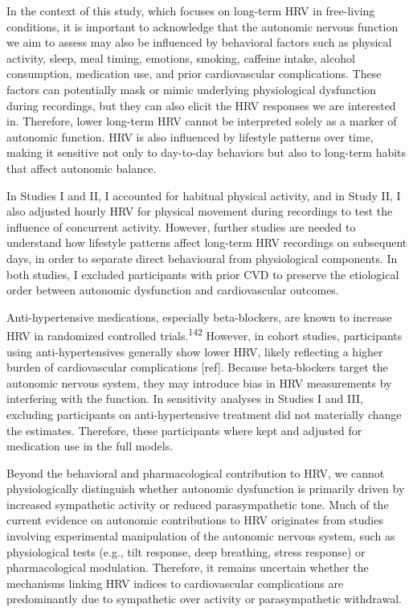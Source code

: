 \documentclass[
  letterpaper,
  headsepline=true,
  open=any]{scrbook}
\begin{document}
In the context of this study, which focuses on long-term HRV in
free-living conditions, it is important to acknowledge that the
autonomic nervous function we aim to assess may also be influenced by
behavioral factors such as physical activity, sleep, meal timing,
emotions, smoking, caffeine intake, alcohol consumption, medication use,
and prior cardiovascular complications. These factors can potentially
mask or mimic underlying physiological dysfunction during recordings,
but they can also elicit the HRV responses we are interested in.
Therefore, lower long-term HRV cannot be interpreted solely as a marker
of autonomic function. HRV is also influenced by lifestyle patterns over
time, making it sensitive not only to day-to-day behaviors but also to
long-term habits that affect autonomic balance.

In Studies I and II, I accounted for habitual physical activity, and in
Study II, I also adjusted hourly HRV for physical movement during
recordings to test the influence of concurrent activity. However,
further studies are needed to understand how lifestyle patterns affect
long-term HRV recordings on subsequent days, in order to separate direct
behavioural from physiological components. In both studies, I excluded
participants with prior CVD to preserve the etiological order between
autonomic dysfunction and cardiovascular outcomes.

Anti-hypertensive medications, especially beta-blockers, are known to
increase HRV in randomized controlled trials.\textsuperscript{142}
However, in cohort studies, participants using anti-hypertensives
generally show lower HRV, likely reflecting a higher burden of
cardiovascular complications {[}ref{]}. Because beta-blockers target the
autonomic nervous system, they may introduce bias in HRV measurements by
interfering with the function. In sensitivity analyses in Studies I and
III, excluding participants on anti-hypertensive treatment did not
materially change the estimates. Therefore, these participants where
kept and adjusted for medication use in the full models.

Beyond the behavioral and pharmacological contribution to HRV, we cannot
physiologically distinguish whether autonomic dysfunction is primarily
driven by increased sympathetic activity or reduced parasympathetic
tone. Much of the current evidence on autonomic contributions to HRV
originates from studies involving experimental manipulation of the
autonomic nervous system, such as physiological tests (e.g., tilt
response, deep breathing, stress response) or pharmacological
modulation. Therefore, it remains uncertain whether the mechanisms
linking HRV indices to cardiovascular complications are predominantly
due to sympathetic over activity or parasympathetic withdrawal.
\end{document}
